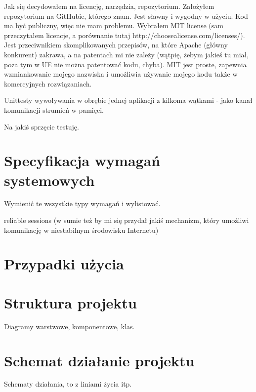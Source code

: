 Jak się decydowałem na licencję, narzędzia, repozytorium.
Założyłem repozytorium na GitHubie, którego znam. Jest sławny i wygodny w użyciu. Kod ma być publiczny, więc nie mam problemu. Wybrałem MIT license (sam przeczytałem licencje, a porównanie tutaj http://choosealicense.com/licenses/). Jest przeciwnikiem skomplikowanych przepisów, na które Apache (główny konkurent) zakrawa, a na patentach mi nie zależy (wątpię, żebym jakieś tu miał, poza tym w UE nie można patentować kodu, chyba). MIT jest proste, zapewnia wzmiankowanie mojego nazwiska i umożliwia używanie mojego kodu także w komercyjnych rozwiązaniach.

Unittesty wywoływania w obrębie jednej aplikacji z kilkoma wątkami - jako kanał komunikacji strumień w pamięci.

Na jakiś sprzęcie testuję.

\section{Specyfikacja wymagań systemowych}
Wymienić te wszystkie typy wymagań i wylistować.

reliable sessions (w sumie też by mi się przydał jakiś mechanizm, który umożliwi komunikację w niestabilnym środowisku Internetu)

\section{Przypadki użycia}

\section{Struktura projektu}
Diagramy warstwowe, komponentowe, klas.

\section{Schemat działanie projektu}
Schematy działania, to z liniami życia itp.